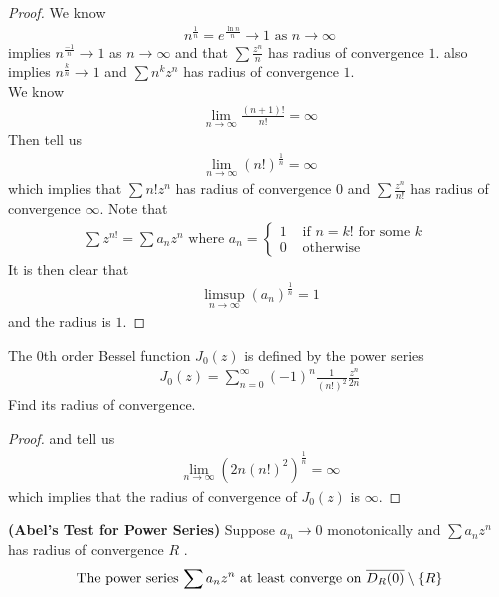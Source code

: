 \documentclass{report}
\begin{document}
\begin{proof}
We know 
\begin{align}
\label{n1n}
n^{\frac{1}{n}}=e^{\frac{\ln n}{n}}\to 1\text{ as }n \to \infty
\end{align}
 implies  $n^{\frac{-1}{n}}\to 1$ as $n\to \infty$ and that $\sum \frac{z^n}{n}$ has radius of convergence $1$.  also implies $n^{\frac{k}{n}}\to 1$ and $\sum n^kz^n$ has radius of convergence $1$. \\

We know 
\begin{align*}
\lim_{n\to \infty} \frac{(n+1)!}{n!}=\infty
\end{align*}
Then   tell us 
\begin{align}
\label{j0z}
\lim_{n\to \infty} (n!)^{\frac{1}{n}}=\infty 
\end{align}
which implies that $\sum n!z^n$ has radius of convergence $0$ and  $\sum \frac{z^n}{n!}$ has radius of convergence $\infty$. Note that 
\begin{align*}
\sum z^{n!}=\sum a_nz^n\text{ where }a_n=\begin{cases}
  1& \text{ if $n=k!$ for some  $k$ }\\
  0& \text{ otherwise }
\end{cases}
\end{align*}
It is then clear that 
\begin{align*}
\limsup_{n\to\infty} (a_n)^{\frac{1}{n}}=1
\end{align*}
and the radius is $1$. 
\end{proof}
\begin{question}{}{}
The $0$th order Bessel function  $J_0(z)$ is defined by the power series 
\begin{align*}
J_0(z)=\sum_{n=0}^{\infty} (-1)^n \frac{1}{(n!)^2} \frac{z^n}{2n}
\end{align*}
Find its radius of convergence.
\end{question}
\begin{proof}
 and  tell us 
\begin{align*}
\lim_{n\to \infty} (2n(n!)^2)^{\frac{1}{n}}=\infty 
\end{align*}
which implies that the radius of convergence of $J_0(z)$ is $\infty$. 
\end{proof}
\begin{theorem}
\label{Abel's Test for Power Series}
\textbf{(Abel's Test for Power Series)} Suppose $a_n\to0$ monotonically and $\sum a_nz^n$ has radius of convergence $R$ . 
\begin{align*}
  \text{ The power series $\sum a_nz^n$ at least converge on $\overline{D_R(0)}\setminus \{ R \}$ }
\end{align*}
\end{theorem}
\end{document}
